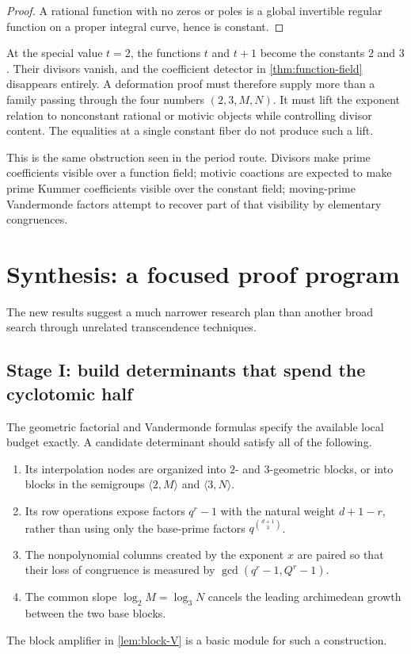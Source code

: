 \documentclass[11pt]{article}
\theoremstyle{definition}
\theoremstyle{remark}
\begin{document}
\begin{proof}
A rational function with no zeros or poles is a global invertible regular
function on a proper integral curve, hence is constant.
\end{proof}

At the special value $t=2$, the functions $t$ and $t+1$ become the constants
$2$ and $3$.  Their divisors vanish, and the coefficient detector in
\cref{thm:function-field} disappears entirely.  A deformation proof must
therefore supply more than a family passing through the four numbers
$(2,3,M,N)$.  It must lift the exponent relation to nonconstant rational or
motivic objects while controlling divisor content.  The equalities at a
single constant fiber do not produce such a lift.

This is the same obstruction seen in the period route.  Divisors make prime
coefficients visible over a function field; motivic coactions are expected to
make prime Kummer coefficients visible over the constant field; moving-prime
Vandermonde factors attempt to recover part of that visibility by elementary
congruences.

\section{Synthesis: a focused proof program}

The new results suggest a much narrower research plan than another broad
search through unrelated transcendence techniques.

\subsection{Stage I: build determinants that spend the cyclotomic half}

The geometric factorial and Vandermonde formulas specify the available local
budget exactly.  A candidate determinant should satisfy all of the following.
\begin{enumerate}
 \item Its interpolation nodes are organized into $2$- and $3$-geometric
       blocks, or into blocks in the semigroups $\langle2,M\rangle$ and
       $\langle3,N\rangle$.
 \item Its row operations expose factors $q^r-1$ with the natural weight
       $d+1-r$, rather than using only the base-prime factors
       $q^{\binom{d+1}{3}}$.
 \item The nonpolynomial columns created by the exponent $x$ are paired so
       that their loss of congruence is measured by
       $\gcd(q^r-1,Q^r-1)$.
 \item The common slope
       $\log_2 M=\log_3 N$ cancels the leading archimedean growth
       between the two base blocks.
\end{enumerate}
The block amplifier in \cref{lem:block-V} is a basic module for such a
construction.
\end{document}
